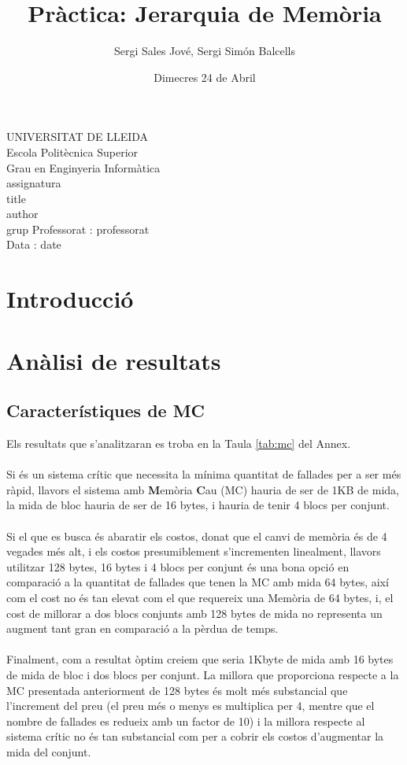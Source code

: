 \documentclass{article}
\title{Pràctica: Jerarquia de Memòria}
\author{Sergi Sales Jové, Sergi Simón Balcells}
\date{Dimecres 24 de Abril}
\renewcommand{\maketitle}{ %
    \begin{titlepage}
        \raggedright{UNIVERSITAT DE LLEIDA \\
            Escola Politècnica Superior \\
            Grau en Enginyeria Informàtica\\
            \1assignatura\\}
            \vspace{5cm}
            \centering\huge{\5title \\}
            \vspace{3cm}
            \large{\6author} \\
            \normalsize{\3grup}
            \vfill
            Professorat : \4professorat \\
            Data : \7date
\end{titlepage}}
\begin{document}
\maketitle
\thispagestyle{empty}

\newpage
{}
\tableofcontents
\newpage
{}
\section{Introducció}
\section{Anàlisi de resultats}

\subsection{Característiques de MC}
Els resultats que s'analitzaran es troba en la Taula \ref{tab:mc} del Annex.\\
\\
Si és un sistema crític que necessita la mínima quantitat de fallades per a ser més
ràpid, llavors el sistema amb \textbf{M}emòria \textbf{C}au (MC) hauria de ser de 1KB
de mida, la mida de bloc hauria de ser de 16 bytes, i hauria de tenir 4 blocs per conjunt.\\
\\
Si el que es busca és abaratir els costos, donat que el canvi de memòria és de 4 vegades més
alt, i els costos presumiblement s'incrementen linealment, llavors utilitzar 128 bytes, 16 bytes i
4 blocs per conjunt és una bona opció en comparació a la quantitat de fallades que tenen la MC amb
mida 64 bytes, així com el cost no és tan elevat com el que requereix una Memòria de 64 bytes,
i, el cost de millorar a dos blocs conjunts amb 128 bytes de mida no representa un augment tant gran
en comparació a la pèrdua de temps.\\
\\
Finalment, com a resultat òptim creiem que seria 1Kbyte de mida amb 16 bytes de mida de bloc i
dos blocs per conjunt. La millora que proporciona respecte a la MC presentada anteriorment de 128 bytes
és molt més substancial que l'increment del preu (el preu més o menys es multiplica per 4, mentre que
el nombre de fallades es redueix amb un factor de 10) i la millora respecte al sistema crític no
és tan substancial com per a cobrir els costos d'augmentar la mida del conjunt.
\end{document}
